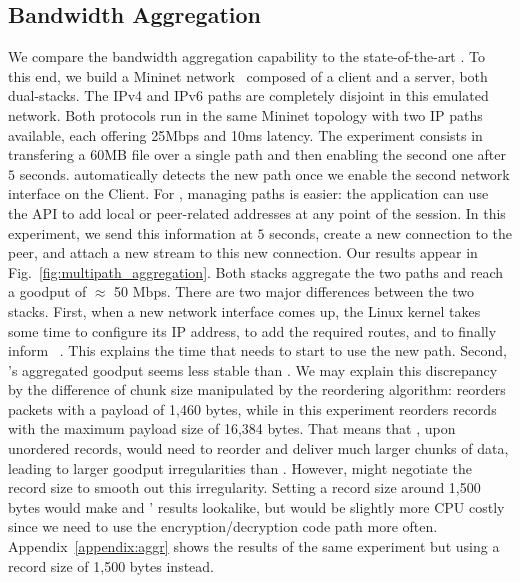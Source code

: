 \subsection{Bandwidth Aggregation}
\label{sec:bwaggr}
We compare the \tcpls bandwidth aggregation capability to the state-of-the-art
\mptcp. To this end, we build a Mininet network~\cite{handigol2012reproducible}
composed of a client and a server, both dual-stacks. The IPv4 and IPv6 paths are completely disjoint in this emulated network. Both protocols run in the same Mininet topology with two IP paths available, each offering 25Mbps and 10ms latency. The experiment consists in transfering a 60MB file over a single path and then enabling the second one after $5$ seconds. \mptcp automatically detects the new path once we enable the second network interface
on the Client. For \tcpls, managing paths is easier: the application can use the API to add local or peer-related addresses at any point of the session. In this experiment, we send this information at $5$ seconds, create a new \tcp connection to the peer, and attach a new stream to this new connection. Our results appear in Fig.~\ref{fig:multipath_aggregation}. Both stacks aggregate the two paths and reach a goodput of $\approx$ 50 Mbps. There are two major differences between the two stacks. First, when a new network interface comes up, the Linux kernel takes some time to configure its IP address, to add the required routes, and to finally inform \mptcp~\cite{paasch2012exploring}.
This explains the time that \mptcp needs to start to use the new path.
Second, \tcpls's aggregated goodput seems less stable than \mptcp. We may explain this discrepancy by the difference of chunk size manipulated by the reordering algorithm: \mptcp reorders packets with a payload of 1,460 bytes, while \tcpls in this experiment reorders records with the maximum payload size of 16,384 bytes. That means that \tcpls, upon unordered records, would need to reorder and deliver much larger chunks of data, leading to larger goodput irregularities than \mptcp. However, \tcpls might negotiate the record size to smooth out this irregularity. Setting a record size around 1,500 bytes would make \mptcp and \tcpls' results lookalike, but would be slightly more CPU costly since we need to use the encryption/decryption code path more often.
Appendix~\ref{appendix:aggr} shows the results of the same experiment but using
a \tls record size of 1,500 bytes instead.

